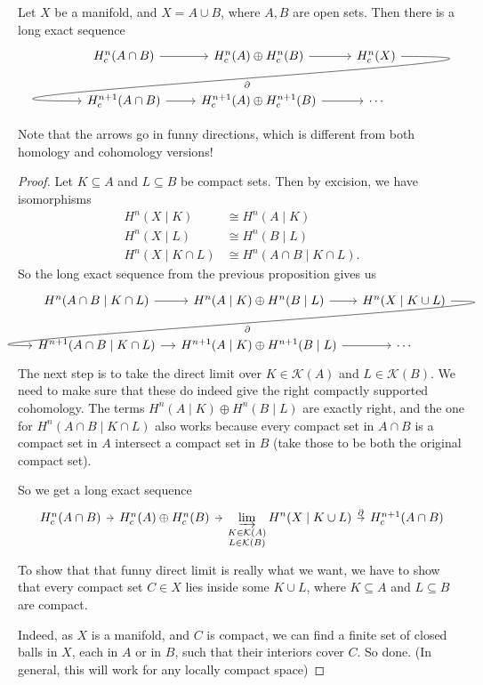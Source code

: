 \documentclass[a4paper]{article}
\begin{document}
\begin{cor}
  Let $X$ be a manifold, and $X = A \cup B$, where $A, B$ are open sets. Then there is a long exact sequence
  \[
    \begin{tikzcd}
      H^n_c(A \cap B) \ar[r] & H^n_c(A) \oplus H^n_c(B) \ar[r] & H_c^n(X)\ar[out=0, in=180, looseness=2, overlay, lld, "\partial"]\\
      H_c^{n+1}(A \cap B) \ar[r] & H_c^{n+1}(A) \oplus H_c^{n+1}(B) \ar[r] & \cdots
    \end{tikzcd}
  \]
\end{cor}
Note that the arrows go in funny directions, which is different from both homology and cohomology versions!

\begin{proof}
  Let $K \subseteq A$ and $L \subseteq B$ be compact sets. Then by excision, we have isomorphisms
  \begin{align*}
    H^n(X \mid K) &\cong H^n(A \mid K)\\
    H^n(X \mid L) &\cong H^n(B \mid L)\\
    H^n(X \mid K \cap L) &\cong H^n(A \cap B \mid K\cap L).
  \end{align*}
  So the long exact sequence from the previous proposition gives us
  \[
    \begin{tikzcd}[column sep=small]
      H^n(A \cap B\mid K \cap L) \ar[r] & H^n(A \mid K) \oplus H^n(B \mid L) \ar[r] & H^n(X \mid K \cup L) \ar[lld, out=0, in=180, overlay, "\partial"]\\
      H^{n + 1}(A \cap B \mid K \cap L) \ar[r] & H^{n + 1}(A \mid K) \oplus H^{n + 1}(B \mid L) \ar[r] & \cdots
    \end{tikzcd}
  \]
  The next step is to take the direct limit over $K \in \mathcal{K}(A)$ and $L \in \mathcal{K}(B)$. We need to make sure that these do indeed give the right compactly supported cohomology. The terms $H^n(A \mid K) \oplus H^n (B \mid L)$ are exactly right, and the one for $H^n(A \cap B \mid K \cap L)$ also works because every compact set in $A \cap B$ is a compact set in $A$ intersect a compact set in $B$ (take those to be both the original compact set).

  So we get a long exact sequence
  \[
    \begin{tikzcd}[column sep=tiny]
      H^n_c(A \cap B) \ar[r] & H^n_c(A) \oplus H^n_c(B) \ar[r] & \displaystyle\varinjlim_{\substack{K \in \mathcal{K}(A)\\ L \in \mathcal{K}(B)}} H^n(X \mid K \cup L) \ar[r, "\partial"] & H^{n + 1}_c(A \cap B)
    \end{tikzcd}
  \]
  To show that that funny direct limit is really what we want, we have to show that every compact set $C \in X$ lies inside some $K \cup L$, where $K \subseteq A$ and $L \subseteq B$ are compact.

  Indeed, as $X$ is a manifold, and $C$ is compact, we can find a finite set of closed balls in $X$, each in $A$ or in $B$, such that their interiors cover $C$. So done. (In general, this will work for any locally compact space)
\end{proof}
\end{document}

